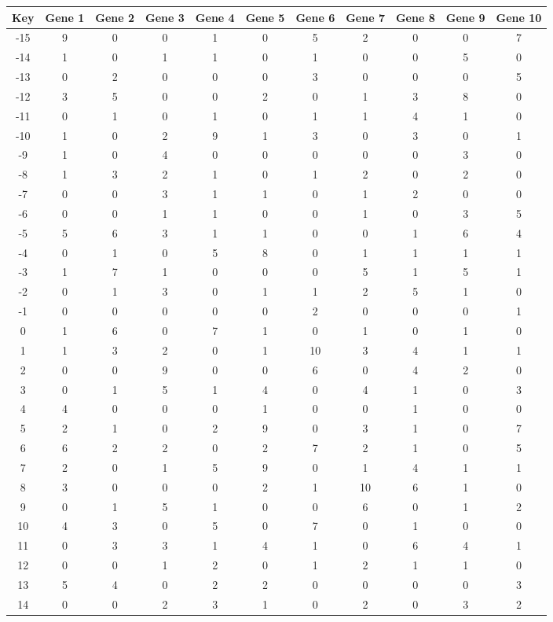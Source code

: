 \begin{tabular}{|c|c|c|c|c|c|c|c|c|c|c|}
\hline
Key & Gene 1 & Gene 2 & Gene 3 & Gene 4 & Gene 5 & Gene 6 & Gene 7 & Gene 8 & Gene 9 & Gene 10 \\
\hline
-15 & 9 & 0 & 0 & 1 & 0 & 5 & 2 & 0 & 0 & 7 \\
-14 & 1 & 0 & 1 & 1 & 0 & 1 & 0 & 0 & 5 & 0 \\
-13 & 0 & 2 & 0 & 0 & 0 & 3 & 0 & 0 & 0 & 5 \\
-12 & 3 & 5 & 0 & 0 & 2 & 0 & 1 & 3 & 8 & 0 \\
-11 & 0 & 1 & 0 & 1 & 0 & 1 & 1 & 4 & 1 & 0 \\
-10 & 1 & 0 & 2 & 9 & 1 & 3 & 0 & 3 & 0 & 1 \\
-9 & 1 & 0 & 4 & 0 & 0 & 0 & 0 & 0 & 3 & 0 \\
-8 & 1 & 3 & 2 & 1 & 0 & 1 & 2 & 0 & 2 & 0 \\
-7 & 0 & 0 & 3 & 1 & 1 & 0 & 1 & 2 & 0 & 0 \\
-6 & 0 & 0 & 1 & 1 & 0 & 0 & 1 & 0 & 3 & 5 \\
-5 & 5 & 6 & 3 & 1 & 1 & 0 & 0 & 1 & 6 & 4 \\
-4 & 0 & 1 & 0 & 5 & 8 & 0 & 1 & 1 & 1 & 1 \\
-3 & 1 & 7 & 1 & 0 & 0 & 0 & 5 & 1 & 5 & 1 \\
-2 & 0 & 1 & 3 & 0 & 1 & 1 & 2 & 5 & 1 & 0 \\
-1 & 0 & 0 & 0 & 0 & 0 & 2 & 0 & 0 & 0 & 1 \\
0 & 1 & 6 & 0 & 7 & 1 & 0 & 1 & 0 & 1 & 0 \\
1 & 1 & 3 & 2 & 0 & 1 & 10 & 3 & 4 & 1 & 1 \\
2 & 0 & 0 & 9 & 0 & 0 & 6 & 0 & 4 & 2 & 0 \\
3 & 0 & 1 & 5 & 1 & 4 & 0 & 4 & 1 & 0 & 3 \\
4 & 4 & 0 & 0 & 0 & 1 & 0 & 0 & 1 & 0 & 0 \\
5 & 2 & 1 & 0 & 2 & 9 & 0 & 3 & 1 & 0 & 7 \\
6 & 6 & 2 & 2 & 0 & 2 & 7 & 2 & 1 & 0 & 5 \\
7 & 2 & 0 & 1 & 5 & 9 & 0 & 1 & 4 & 1 & 1 \\
8 & 3 & 0 & 0 & 0 & 2 & 1 & 10 & 6 & 1 & 0 \\
9 & 0 & 1 & 5 & 1 & 0 & 0 & 6 & 0 & 1 & 2 \\
10 & 4 & 3 & 0 & 5 & 0 & 7 & 0 & 1 & 0 & 0 \\
11 & 0 & 3 & 3 & 1 & 4 & 1 & 0 & 6 & 4 & 1 \\
12 & 0 & 0 & 1 & 2 & 0 & 1 & 2 & 1 & 1 & 0 \\
13 & 5 & 4 & 0 & 2 & 2 & 0 & 0 & 0 & 0 & 3 \\
14 & 0 & 0 & 2 & 3 & 1 & 0 & 2 & 0 & 3 & 2 \\
\hline
\end{tabular}